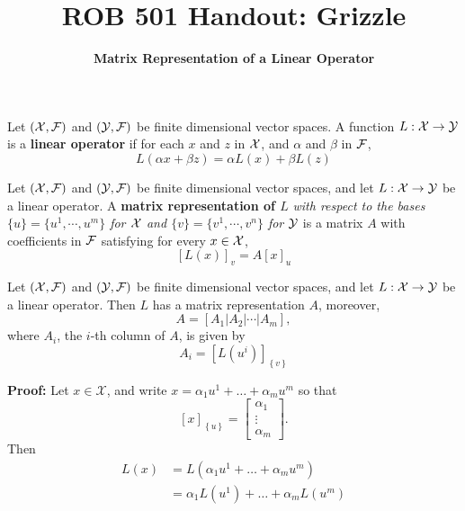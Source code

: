 \documentclass[11pt,twoside]{nsf_jwg} %
\begin{document}
\baselineskip=24pt  %


\pagestyle{plain}

\title{\Large \bf  ROB 501 Handout: Grizzle}

\author{ {\bf Matrix Representation of a Linear Operator}
}

\maketitle


\Large

 Let $(\cal X, \cal F)$ and $(\cal Y, \cal F)$ be finite dimensional vector spaces. A function $L: \cal X \rightarrow \cal Y$ is a \textbf{ linear operator} if for each $x$ and $z$ in $\cal X$, and $\alpha$ and $\beta$ in $\cal F$,
$$L(\alpha x + \beta z)= \alpha L(x) + \beta L(z) $$

\vspace*{.3in}

 Let $(\cal X, \cal F)$ and $(\cal Y, \cal F)$ be finite dimensional vector spaces, and let $L: \cal X \rightarrow \cal Y$ be a linear operator. A {\bf matrix representation of $L$} {\it with respect to the bases $\{u\}=\{u^1,\cdots,u^m \}$ for $\cal X$ and  $\{v\}=\{v^1,\cdots,v^n \}$ for $\cal Y$} is a matrix $A$ with coefficients in $\cal F$ satisfying for every $x \in \cal X$,
$$ [L(x)]_v = A [x]_u $$

 Let $(\cal X, \cal F)$ and $(\cal Y, \cal F)$ be finite dimensional vector spaces, and let $L: \cal X \rightarrow \cal Y$ be a linear operator. Then $L$ has a matrix representation $A$, moreover,
$$ A= [A_1|A_2|\cdots|A_m],$$
where $A_i$, the $i$-th column of $A$, is given by
$$
A_{i}  =  \left[L\left(u^{i}\right)\right]_{\left\{ v\right\} }$$

\vspace*{.3in}


 \textbf{Proof:} Let $x\in\mathcal{X}$, and write $x=\alpha_{1}u^{1}+\ldots+\alpha_{m}u^{m}$ so that
 $$\left[x\right]_{\left\{ u\right\} }=\left[\begin{array}{c}
\alpha_{1}\\
\vdots\\
\alpha_{m}
\end{array}\right].$$ Then
\begin{align*}
L\left(x\right) & =L\left(\alpha_{1}u^{1}+\ldots+\alpha_{m}u^{m}\right)\\
 & =\alpha_{1}L\left(u^{1}\right)+\ldots+\alpha_{m}L\left(u^{m}\right)
 \end{align*}
\end{document}

